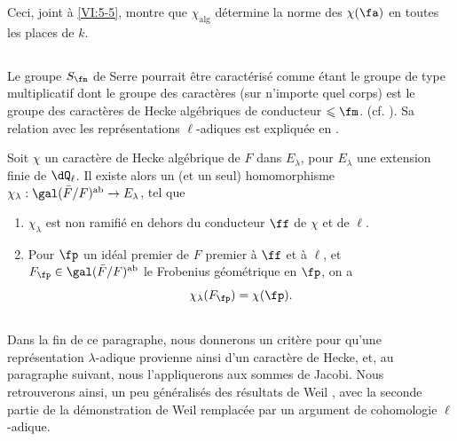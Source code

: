Ceci, joint à \ref{VI:5-5}, montre que $\chi_\text{alg}$ détermine la norme 
des $\chi(\fa)$ en toutes les places de $k$. 





\subsection{}\label{VI:5-7}

Le groupe $S_\fm$ de Serre pourrait être caractérisé comme étant le 
groupe de type multiplicatif dont le groupe des caractères (sur n'importe 
quel corps) est le groupe des caractères de Hecke algébriques de conducteur 
$\leqslant \fm$. (cf. ). Sa relation avec les 
représentations $\ell$-adiques est expliquée en . 





\begin{theorem_}\label{VI:5-8}
Soit $\chi$ un caractère de Hecke algébrique de $F$ dans $E_\lambda$, pour 
$E_\lambda$ une extension finie de $\dQ_\ell$. Il existe alors un (et un seul) 
homomorphisme $\chi_\lambda:\gal(\bar F/F)^\textnormal{ab} \to E_\lambda$, tel 
que 
\begin{enumerate}[\indent (i)]
  \item $\chi_\lambda$ est non ramifié en dehors du conducteur $\ff$ de 
    $\chi$ et de $\ell$. 
  \item Pour $\fp$ un idéal premier de $F$ premier à $\ff$ et à $\ell$, 
    et $F_\fp\in \gal(\bar F/F)^\textnormal{ab}$ le Frobenius géométrique 
    en $\fp$, on a 
    \[
      \chi_\lambda(F_\fp) = \chi(\fp) \text{.}
    \] 
\end{enumerate}
\end{theorem_}





\subsection{}\label{VI:5-9}

Dans la fin de ce paragraphe, nous donnerons un critère pour qu'une 
représentation $\lambda$-adique provienne ainsi d'un caractère de Hecke, 
et, au paragraphe suivant, nous l'appliquerons aux sommes de Jacobi. Nous 
retrouverons ainsi, un peu généralisés des résultats de Weil 
, avec la seconde partie de la démonstration de Weil 
remplacée par un argument de cohomologie $\ell$-adique. 





